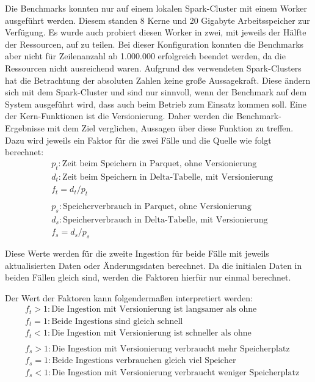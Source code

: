 Die Benchmarks konnten nur auf einem lokalen Spark-Cluster mit einem Worker ausgeführt werden.
Diesem standen 8 Kerne und 20 Gigabyte Arbeitsspeicher zur Verfügung.
Es wurde auch probiert diesen Worker in zwei, mit jeweils der Hälfte der Ressourcen, auf zu teilen.
Bei dieser Konfiguration konnten die Benchmarks aber nicht für Zeilenanzahl ab 1.000.000 erfolgreich beendet werden, da die Ressourcen nicht ausreichend waren.
Aufgrund des verwendeten Spark-Clusters hat die Betrachtung der absoluten Zahlen keine große Aussagekraft.
Diese ändern sich mit dem Spark-Cluster und sind nur sinnvoll, wenn der Benchmark auf dem System ausgeführt wird, dass auch beim Betrieb zum Einsatz kommen soll.
Eine der Kern-Funktionen ist die Versionierung.
Daher werden die Benchmark-Ergebnisse mit dem Ziel verglichen, Aussagen über diese Funktion zu treffen.
Dazu wird jeweils ein Faktor für die zwei Fälle und die Quelle wie folgt berechnet:
\begin{align*}
    & p_t: \text{Zeit beim Speichern in Parquet, ohne Versionierung} \\
    & d_t: \text{Zeit beim Speichern in Delta-Tabelle, mit Versionierung} \\
    & f_t = d_t / p_t \\ \\
    & p_s: \text{Speicherverbrauch in Parquet, ohne Versionierung} \\
    & d_s: \text{Speicherverbrauch in Delta-Tabelle, mit Versionierung} \\
    & f_s = d_s / p_s \\ \\
\end{align*}
Diese Werte werden für die zweite Ingestion für beide Fälle mit jeweils aktualisierten Daten oder Änderungsdaten berechnet.
Da die initialen Daten in beiden Fällen gleich sind, werden die Faktoren hierfür nur einmal berechnet.

Der Wert der Faktoren kann folgendermaßen interpretiert werden: \begin{align*} 
    & f_t > 1: \text{Die Ingestion mit Versionierung ist langsamer als ohne} \\
    & f_t = 1: \text{Beide Ingestions sind gleich schnell} \\
    & f_t < 1: \text{Die Ingestion mit Versionierung ist schneller als ohne} \\ \\
    & f_s > 1: \text{Die Ingestion mit Versionierung verbraucht mehr Speicherplatz} \\
    & f_s = 1: \text{Beide Ingestions verbrauchen gleich viel Speicher} \\
    & f_s < 1: \text{Die Ingestion mit Versionierung verbraucht weniger Speicherplatz}
\end{align*}

